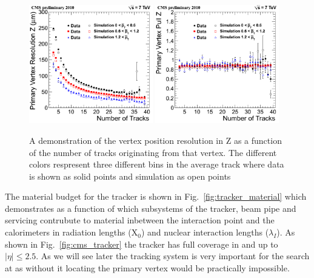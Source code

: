 \begin{figure}
  \includegraphics[width=0.48\textwidth]{cms_experiment/plots/ResZ_byPt.png}
  \includegraphics[width=0.48\textwidth]{cms_experiment/plots/PullZ_byPt.png}
  \caption[Vertex resolution]{A demonstration of the vertex position resolution in Z as a function of the number of tracks originating from that vertex. The different colors respresent three different bins in the average track \pT where data is shown as solid points and simulation as open points~\cite{cms-tracker-performance-2010} }
  \label{fig:tracker_vertex_resolution}
\end{figure}

The material budget for the tracker is shown in Fig.~\ref{fig:tracker_material} which demonstrates as a function of \eta which subsystems of the tracker, beam pipe and servicing contrubute to material inbetween the interaction point and the calorimeters in radiation lengths (X$_{0}$) and nuclear interaction lengths ($\lambda_{I}$). As shown in Fig.~\ref{fig:cms_tracker} the tracker has full coverage in \phi and up to $|\eta|\leq2.5$. As we will see later the tracking system is very important for the \Hgg search at \CMS as without it locating the primary vertex would be practically impossible.

